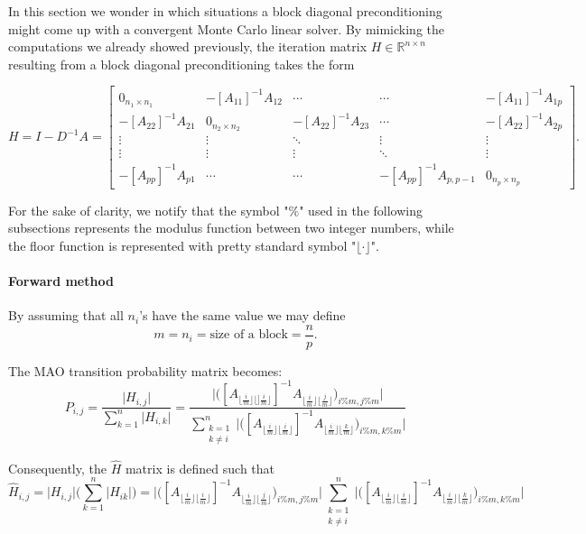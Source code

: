 \documentclass[a4paper,10pt]{article}
\begin{document}
 In this section we wonder in which situations a block diagonal preconditioning
might come up with a convergent Monte Carlo linear solver.
By mimicking the computations we already showed previously, the iteration
matrix $H\in\mathbb{R}^{n\times n}$ resulting from a block diagonal
preconditioning takes the form

\[
 H=I-D^{-1}A=\begin{bmatrix}0_{n_1\times n_1} & -[A_{11}]^{-1}A_{12} & \cdots &
\cdots & -[A_{11}]^{-1}A_{1p} \\
-[A_{22}]^{-1}A_{21} & 0_{n_2\times n_2} & -[A_{22}]^{-1}A_{23} &
\cdots & -[A_{22}]^{-1}A_{2p}\\
\vdots & \vdots & \ddots & \vdots & \vdots\\
\vdots & \vdots & \vdots &\ddots & \vdots \\
-[A_{pp}]^{-1}A_{p1} &  \cdots & \cdots&
-[A_{pp}]^{-1}A_{p,p-1} & 0_{n_p \times n_p}
\end{bmatrix}.
\]

For the sake of clarity, we notify that the symbol "$\%$" used in the following
subsections represents the modulus function between two integer numbers, while
the floor function is represented with pretty standard symbol "$\lfloor
\cdot \rfloor$".

\paragraph{Forward method}
By assuming that all $n_i$'s have the same value we may define
\[
 m=n_i=\text{size of a block}=\frac{n}{p}.
\]

The MAO transition probability matrix becomes:
\[
 P_{i,j}=\frac{\lvert H_{i,j} \rvert}{\sum_{k=1}^n\lvert H_{i,k}
\rvert}=\frac{\bigg \lvert \bigg ([A_{\lfloor
\frac{i}{m}\rfloor \lfloor]
\frac{i}{m}\rfloor}]^{-1} A_{\lfloor \frac{i}{m}\rfloor \lfloor
\frac{j}{m}\rfloor}\bigg )_{i\%m,j\%m}\bigg
\rvert}{\sum_{\substack{k=1\\k\ne i}}^n\bigg \lvert \bigg
([A_{\lfloor
\frac{i}{m}\rfloor \lfloor
\frac{i}{m}\rfloor}]^{-1} A_{\lfloor \frac{i}{m}\rfloor \lfloor
\frac{k}{m}\rfloor}\bigg )_{i\%m,k\%m}\bigg \rvert}
\]

Consequently, the $\hat{H}$ matrix is defined such that
\[
\hat{H}_{i,j} = \lvert H_{i,j}\rvert\bigg(\sum_{k=1}^n\lvert H_{ik}\rvert\bigg)=
\bigg \lvert \bigg ([A_{\lfloor \frac{i}{m}\rfloor \lfloor
\frac{i}{m}\rfloor}]^{-1} A_{\lfloor \frac{i}{m}\rfloor \lfloor
\frac{j}{m}\rfloor}\bigg )_{i\%m,j\%m}\bigg
\rvert
\sum_{\substack{k=1\\k\ne i}}^n\bigg \lvert \bigg ([A_{\lfloor
\frac{i}{m}\rfloor \lfloor
\frac{i}{m}\rfloor}]^{-1} A_{\lfloor \frac{i}{m}\rfloor \lfloor
\frac{k}{m}\rfloor}\bigg )_{i\%m,k\%m}\bigg \rvert
\]
\end{document}
